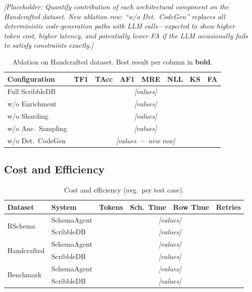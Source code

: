 \textit{[Placeholder: Quantify contribution of each architectural component on the
Handcrafted dataset.
New ablation row: ``w/o Det.\ CodeGen'' replaces all deterministic code-generation
paths with LLM calls---expected to show higher token cost, higher latency, and
potentially lower FA if the LLM occasionally fails to satisfy constraints exactly.]}

\begin{table}[t]
  \caption{Ablation on Handcrafted dataset. Best result per column in \textbf{bold}.}
  \label{tab:ablation}
  \centering
  \small
  \begin{tabular}{lccccccc}
    \toprule
    Configuration & TF1 & TAcc & AF1 & MRE & NLL & KS & FA \\
    \midrule
    Full ScribbleDB    & \multicolumn{7}{c}{\textit{[values]}} \\
    w/o Enrichment     & \multicolumn{7}{c}{\textit{[values]}} \\
    w/o Sharding       & \multicolumn{7}{c}{\textit{[values]}} \\
    w/o Anc.\ Sampling & \multicolumn{7}{c}{\textit{[values]}} \\
    w/o Det.\ CodeGen  & \multicolumn{7}{c}{\textit{[values --- new row]}} \\
    \bottomrule
  \end{tabular}
\end{table}

\subsection{Cost and Efficiency}
\label{subsec:cost}

\begin{table}[t]
  \caption{Cost and efficiency (avg.\ per test case).}
  \label{tab:efficiency}
  \centering
  \small
  \begin{tabular}{llcccc}
    \toprule
    Dataset & System & Tokens & Sch.\ Time & Row Time & Retries \\
    \midrule
    \multirow{2}{*}{RSchema}
      & SchemaAgent & \multicolumn{4}{c}{\textit{[values]}} \\
      & ScribbleDB  & \multicolumn{4}{c}{\textit{[values]}} \\
    \midrule
    \multirow{2}{*}{Handcrafted}
      & SchemaAgent & \multicolumn{4}{c}{\textit{[values]}} \\
      & ScribbleDB  & \multicolumn{4}{c}{\textit{[values]}} \\
    \midrule
    \multirow{2}{*}{Benchmark}
      & SchemaAgent & \multicolumn{4}{c}{\textit{[values]}} \\
      & ScribbleDB  & \multicolumn{4}{c}{\textit{[values]}} \\
    \bottomrule
  \end{tabular}
\end{table}

